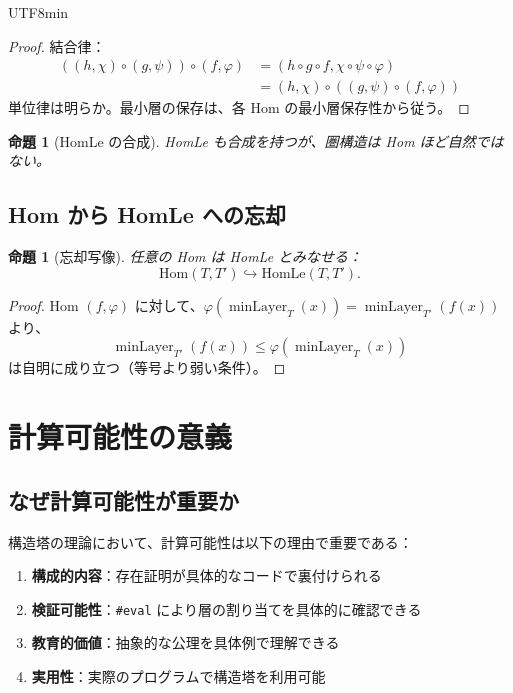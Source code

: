 \documentclass[12pt,a4paper]{article}
\newtheorem{proposition}[theorem]{命題}
\theoremstyle{definition}
\theoremstyle{remark}
\DeclareMathOperator{\minLayer}{minLayer}
\begin{document}
\begin{CJK}{UTF8}{min}
\begin{proof}
結合律：
\begin{align*}
((h, \chi) \circ (g, \psi)) \circ (f, \varphi) &= (h \circ g \circ f, \chi \circ \psi \circ \varphi) \\
&= (h, \chi) \circ ((g, \psi) \circ (f, \varphi))
\end{align*}
単位律は明らか。最小層の保存は、各 Hom の最小層保存性から従う。
\end{proof}

\begin{proposition}[HomLe の合成]
HomLe も合成を持つが、圏構造は Hom ほど自然ではない。
\end{proposition}

\subsection{Hom から HomLe への忘却}

\begin{proposition}[忘却写像]
任意の Hom は HomLe とみなせる：
$$\text{Hom}(T, T') \hookrightarrow \text{HomLe}(T, T').$$
\end{proposition}

\begin{proof}
Hom $(f, \varphi)$ に対して、$\varphi(\minLayer_T(x)) = \minLayer_{T'}(f(x))$ より、
$$\minLayer_{T'}(f(x)) \leq \varphi(\minLayer_T(x))$$
は自明に成り立つ（等号より弱い条件）。
\end{proof}

\section{計算可能性の意義}

\subsection{なぜ計算可能性が重要か}

構造塔の理論において、計算可能性は以下の理由で重要である：

\begin{enumerate}
\item \textbf{構成的内容}：存在証明が具体的なコードで裏付けられる
\item \textbf{検証可能性}：\texttt{\#eval} により層の割り当てを具体的に確認できる
\item \textbf{教育的価値}：抽象的な公理を具体例で理解できる
\item \textbf{実用性}：実際のプログラムで構造塔を利用可能
\end{enumerate}


\end{CJK}
\end{document}
